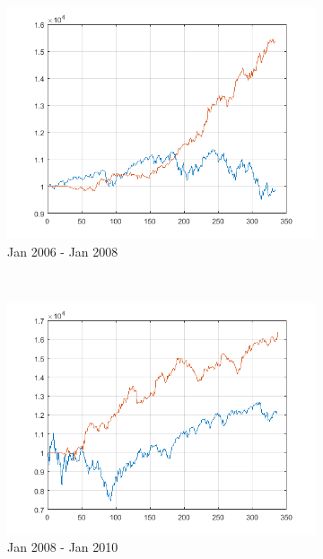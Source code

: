 \documentclass[11pt,a4,twosided,singlespacing,titlepagenumber=on]{scrreprt}
\numberwithin{equation}{chapter} %
\theoremstyle{remark}
\begin{document}
\begin{figure}[H]
\begin{subfigure}[t]{0.32\textwidth}
        \includegraphics[width=1\textwidth]{res/backtest_cpx/9}
        \caption{Jan 2006 - Jan 2008}
    \end{subfigure} \\
    \begin{subfigure}[t]{0.32\textwidth}
        \centering
        \includegraphics[width=1\textwidth]{res/strats/complex}
        \caption{Jan 2008 - Jan 2010}
    \end{subfigure}
    \begin{subfigure}[t]{0.32\textwidth}
        \centering

\end{subfigure}
\end{figure}
\end{document}
